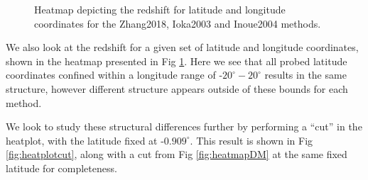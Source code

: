 \documentclass{article}
\begin{document}
\begin{figure}[!htb]
\centering
{}\hfill
{}\par 
{}
\caption{Heatmap depicting the redshift for latitude and longitude coordinates for the Zhang2018, Ioka2003 and Inoue2004 methods.}
\label{fig:heatplotZ}
\end{figure}

We also look at the redshift for a given set of latitude and longitude coordinates, shown in the heatmap presented in Fig \ref{fig:heatplotZ}. Here we see that all probed latitude coordinates confined within a longitude range of -$20^\circ-20^\circ$ results in the same structure, however different structure appears outside of these bounds for each method. 

We look to study these structural differences further by performing a ``cut'' in the heatplot, with the latitude fixed at -$0.909^\circ$. This result is shown in Fig \ref{fig:heatplotcut}, along with a cut from Fig \ref{fig:heatmapDM} at the same fixed latitude for completeness.
\end{document}
